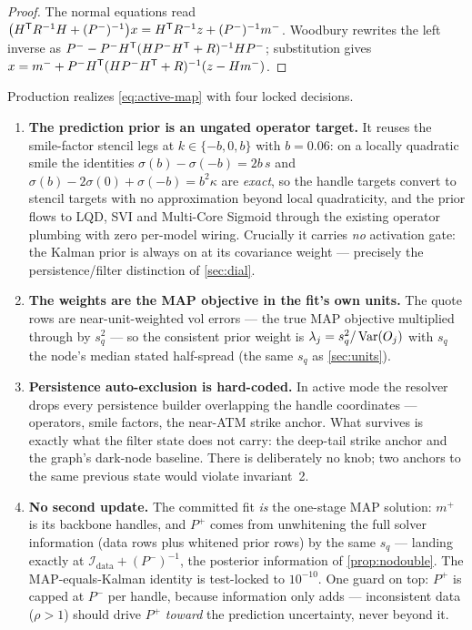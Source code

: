 \documentclass[11pt]{article}
\newcommand{\calI}{\mathcal I}
\begin{document}
\begin{proof}
The normal equations read
$\big(H^{\mathsf{T}} R^{-1}H+(P^-)^{-1}\big)x=H^{\mathsf{T}} R^{-1}z+(P^-)^{-1}m^-$.
Woodbury rewrites the left inverse as
$P^--P^-H^{\mathsf{T}}(HP^-H^{\mathsf{T}}+R)^{-1}HP^-$; substitution gives
$x=m^-+P^-H^{\mathsf{T}}(HP^-H^{\mathsf{T}}+R)^{-1}(z-Hm^-)$.
\end{proof}

Production realizes \cref{eq:active-map} with four locked decisions.

\begin{enumerate}[leftmargin=1.6em]
\item \textbf{The prediction prior is an ungated operator target.}  It
reuses the smile-factor stencil legs at $k\in\{-b,0,b\}$ with $b=0.06$:
on a locally quadratic smile the identities
$\sigma(b)-\sigma(-b)=2b\,s$ and
$\sigma(b)-2\sigma(0)+\sigma(-b)=b^2\kappa$ are \emph{exact}, so the
handle targets convert to stencil targets with no approximation beyond
local quadraticity, and the prior flows to LQD, SVI and Multi-Core
Sigmoid through the existing operator plumbing with zero per-model
wiring.  Crucially it carries \emph{no} activation gate: the Kalman
prior is always on at its covariance weight --- precisely the
persistence/filter distinction of \cref{sec:dial}.
\item \textbf{The weights are the MAP objective in the fit's own
units.}  The quote rows are near-unit-weighted vol errors --- the true
MAP objective multiplied through by $s_q^2$ --- so the consistent prior
weight is $\lambda_j=s_q^2/\operatorname{Var}(O_j)$ with $s_q$ the node's median
stated half-spread (the same $s_q$ as \cref{sec:units}).
\item \textbf{Persistence auto-exclusion is hard-coded.}  In active
mode the resolver drops every persistence builder overlapping the
handle coordinates --- operators, smile factors, the near-ATM strike
anchor.  What survives is exactly what the filter state does not carry:
the deep-tail strike anchor and the graph's dark-node baseline.  There
is deliberately no knob; two anchors to the same previous state would
violate invariant~2.
\item \textbf{No second update.}  The committed fit \emph{is} the
one-stage MAP solution: $m^+$ is its backbone handles, and $P^+$ comes
from unwhitening the full solver information (data rows plus whitened
prior rows) by the same $s_q$ --- landing exactly at
$\calI_{\mathrm{data}}+(P^-)^{-1}$, the posterior information of
\cref{prop:nodouble}.  The MAP-equals-Kalman identity is test-locked to
$10^{-10}$.  One guard on top: $P^+$ is capped at $P^-$ per handle,
because information only adds --- inconsistent data ($\rho>1$) should
drive $P^+$ \emph{toward} the prediction uncertainty, never beyond it.
\end{enumerate}
\end{document}
